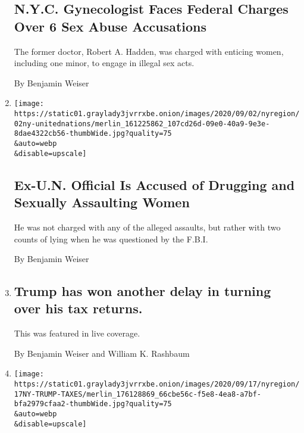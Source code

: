 \begin{enumerate}
{  \subsection{N.Y.C. Gynecologist Faces Federal Charges Over 6 Sex Abuse
  Accusations}\label{nyc-gynecologist-faces-federal-charges-over-6-sex-abuse-accusations}}

  The former doctor, Robert A. Hadden, was charged with enticing women,
  including one minor, to engage in illegal sex acts.

  By Benjamin Weiser
\item
  \href{/2020/09/02/nyregion/karim-elkorany-united-nations.html}{}

  \texttt{[image: https://static01.graylady3jvrrxbe.onion/images/2020/09/02/nyregion/02ny-unitednations/merlin\_161225862\_107cd26d-09e0-40a9-9e3e-8dae4322cb56-thumbWide.jpg?quality=75\\\&auto=webp\\\&disable=upscale]}

  \hypertarget{ex-un-official-is-accused-of-drugging-and-sexually-assaulting-women}{%
  \subsection{Ex-U.N. Official Is Accused of Drugging and Sexually
  Assaulting
  Women}\label{ex-un-official-is-accused-of-drugging-and-sexually-assaulting-women}}

  He was not charged with any of the alleged assaults, but rather with
  two counts of lying when he was questioned by the F.B.I.

  By Benjamin Weiser
\item
  \href{/live/2020/09/01/us/trump-vs-biden/trump-has-won-another-delay-in-turning-over-his-tax-returns}{}

  \hypertarget{trump-has-won-another-delay-in-turning-over-his-tax-returns}{%
  \subsection{Trump has won another delay in turning over his tax
  returns.}\label{trump-has-won-another-delay-in-turning-over-his-tax-returns}}

  This was featured in live coverage.

  By Benjamin Weiser and William K. Rashbaum
\item
  \href{/2020/09/01/nyregion/trump-taxes-vance-lawsuit.html}{}

  \texttt{[image: https://static01.graylady3jvrrxbe.onion/images/2020/09/17/nyregion/17NY-TRUMP-TAXES/merlin\_176128869\_66cbe56c-f5e8-4ea8-a7bf-bfa2979cfaa2-thumbWide.jpg?quality=75\\\&auto=webp\\\&disable=upscale]}


\end{enumerate}
